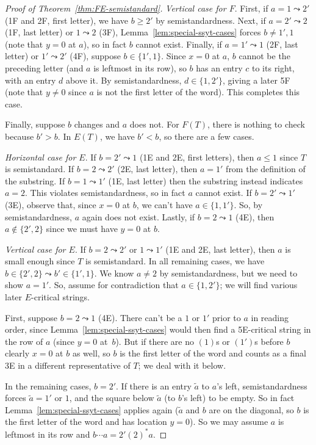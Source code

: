 \documentclass[ALCO,ThmDefs,Unicode,epreuves]{cedram}
\begin{document}
\begin{proof}[Proof of Theorem~\ref{thm:FE-semistandard}]
\emph{Vertical case for $F$}. 
First, if $a = 1 \leadsto 2'$ (1F and 2F, first letter), we have $b \geq 2'$ by semistandardness. Next, if $a = 2' \leadsto 2$ (1F, last letter) or $1 \leadsto 2$ (3F), Lemma~\ref{lem:special-ssyt-cases} forces $b \ne 1',1$ (note that $y=0$ at $a$), so in fact $b$ cannot exist. Finally, if $a = 1' \leadsto 1$ (2F, last letter) or $1' \leadsto 2'$ (4F), suppose $b \in \{1',1\}$. Since $x=0$ at $a$, $b$ cannot be the preceding letter (and $a$ is leftmost in its row), so $b$ has an entry $c$ to its right, with an entry $d$ above it. By semistandardness, $d \in \{1,2'\}$, giving a later 5F (note that $y\ne0$ since $a$ is not the first letter of the word). This completes this case.

Finally, suppose $b$ changes and $a$ does not. For $F(T)$, there is nothing to check because $b' > b$. In $E(T)$, we have $b' < b$, so there are a few cases.

\emph{Horizontal case for $E$}. If $b = 2' \leadsto 1$ (1E and 2E, first letters), then $a \leq 1$ since $T$ is semistandard. If $b = 2 \leadsto 2'$ (2E, last letter), then $a = 1'$ from the definition of the substring. If $b = 1 \leadsto 1'$ (1E, last letter) then the substring instead indicates $a=2$. This violates semistandardness, so in fact $a$ cannot exist. If $b = 2' \leadsto 1'$ (3E), observe that, since $x=0$ at $b$, we can't have $a \in \{1,1'\}$. So, by semistandardness, $a$ again does not exist. Lastly, if $b = 2 \leadsto 1$ (4E), then $a \notin \{2',2\}$ since we must have $y=0$ at $b$. 

\emph{Vertical case for $E$}. If $b = 2 \leadsto 2'$ or $1 \leadsto 1'$ (1E and 2E, last letter), then $a$ is small enough since $T$ is semistandard. In all remaining cases, we have $b \in \{2',2\} \leadsto b' \in \{1',1\}$. We know $a \ne 2$ by semistandardness, but we need to show $a = 1'$. So, assume for contradiction that $a \in \{1,2'\}$; we will find various later $E$-critical strings.

First, suppose $b = 2 \leadsto 1$ (4E). There can't be a $1$ or $1'$ prior to $a$ in reading order, since Lemma~\ref{lem:special-ssyt-cases} would then find a 5E-critical string in the row of $a$ (since $y=0$ at~$b$). But if there are no $(1)$s or $(1')$s before $b$ clearly $x=0$ at $b$ as well, so $b$ is the first letter of the word and counts as a final 3E in a different representative of $T$; we deal with it below.

In the remaining cases, $b = 2'$. If there is an entry $\tilde{a}$ to $a$'s left, semistandardness forces $\tilde{a} = 1'$ or $1$, and the square below $\tilde{a}$ (to $b$'s left) to be empty. So in fact Lemma~\ref{lem:special-ssyt-cases} applies again ($\tilde{a}$ and $b$ are on the diagonal, so $b$ is the first letter of the word and has location $y=0$). So we may assume $a$ is leftmost in its row and $b \cdots a = 2' (2)^* a$.


\end{proof}
\end{document}
